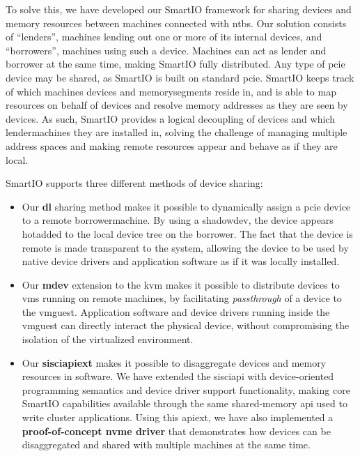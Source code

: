 To solve this, we have developed our SmartIO framework for sharing devices and memory resources between machines connected with \glspl{ntb}.
%
Our solution consists of ``\glspl{lender}'', machines lending out one or more of its internal devices, and ``\glspl{borrower}'', machines using such a device.
%
Machines can act as \gls{lender} and \gls{borrower} at the same time, making SmartIO fully distributed.
%
Any type of \gls{pcie} device may be shared, as SmartIO is built on standard \gls{pcie}.
%
SmartIO keeps track of which machines devices and \glspl{memorysegment} reside in, and is able to map resources on behalf of devices and resolve memory addresses as they are seen by devices.
%
As such, SmartIO provides a logical decoupling of devices and which \glspl{lendermachine} they are installed in, solving the challenge of managing multiple address spaces and making remote resources appear and behave as if they are local.




SmartIO supports three different methods of device sharing:
%
\begin{itemize}
    \item Our \textbf{\gls{dl}} sharing method makes it possible to dynamically assign a \gls{pcie} device to a remote \gls{borrowermachine}.
        By using a \gls{shadowdev}, the device appears \gls{hotadded} to the local device tree on the \gls{borrower}.
        The fact that the device is remote is made transparent to the system, allowing the device to be used by native device drivers and application software as if it was locally installed.


    \item Our \textbf{\gls{mdev}} extension to the \gls{kvm} makes it possible to distribute devices to \glspl{vm} running on remote machines, by facilitating \emph{\gls{passthrough}} of a device to the \gls{vmguest}.
        Application software and device drivers running inside the \gls{vmguest} can directly interact the physical device, without compromising the isolation of the virtualized environment.


    \item Our \textbf{\gls{sisciapiext}} makes it possible to \gls{disaggregate} devices and memory resources in software.
        We have extended the \gls{sisciapi} with device-oriented programming semantics and device driver support functionality, making core SmartIO capabilities available through the same shared-memory \gls{api} used to write cluster applications.
        Using this \gls{apiext}, we have also implemented a \textbf{proof-of-concept \gls{nvme} driver} that demonstrates how devices can be \gls{disaggregated} and shared with multiple machines at the same time.
        
\end{itemize}



